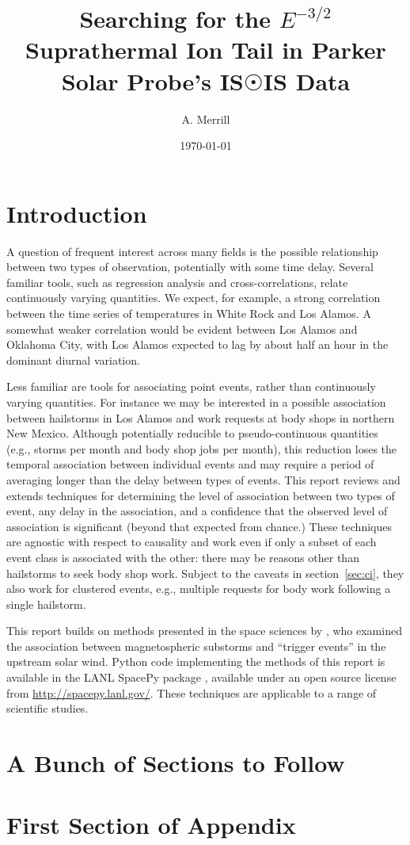 \documentclass[letterpaper,11pt]{article}
\begin{document}
\title{Searching for the $E^{-3/2}$ Suprathermal Ion Tail in Parker Solar Probe's IS$\Sun$IS Data}
\author{A. Merrill}
\date{\today}
\maketitle

\begin{abstract}
\lipsum[1]
\end{abstract}


\section{Introduction}
\label{sec:intro}
A question of frequent interest across many fields is the possible
relationship between two types of observation, potentially with some
time delay. Several familiar tools, such as regression analysis and
cross-correlations, relate continuously varying quantities. We expect,
for example, a strong correlation between the time series of
temperatures in White Rock and Los Alamos. A somewhat weaker
correlation would be evident between Los Alamos and Oklahoma
City, with Los Alamos expected to lag by about half an hour in the
dominant diurnal variation.

Less familiar are tools for associating point events, rather than
continuously varying quantities. For instance we may be interested in
a possible association between hailstorms in Los Alamos and work
requests at body shops in northern New Mexico. Although potentially
reducible to pseudo-continuous quantities (e.g., storms per month and
body shop jobs per month), this reduction loses the temporal
association between individual events and may require a period of
averaging longer than the delay between types of events. This report
reviews and extends techniques for determining the level of
association between two types of event, any delay in the association,
and a confidence that the observed level of association is significant
(beyond that expected from chance.) These techniques are agnostic
with respect to causality and work even if only a subset of each event
class is associated with the other: there may be reasons other than
hailstorms to seek body shop work. Subject to the caveats in
section~\ref{sec:ci}, they also work for clustered events,
e.g., multiple requests for body work following a single hailstorm.

This report builds on methods presented in the space sciences by
\citet{2007GeoRL..3408104M}, who examined the association between
magnetospheric substorms and ``trigger events'' in the upstream solar
wind. Python code implementing the methods of this report is available
in the LANL SpacePy package \citep[LA-CC-10-064;][]{spacepy11},
available under an open source license from
\url{http://spacepy.lanl.gov/}. These techniques are applicable to a
range of scientific studies.

\section{A Bunch of Sections to Follow}
\lipsum

\appendix
\section{First Section of Appendix}
\lipsum



\end{document}
